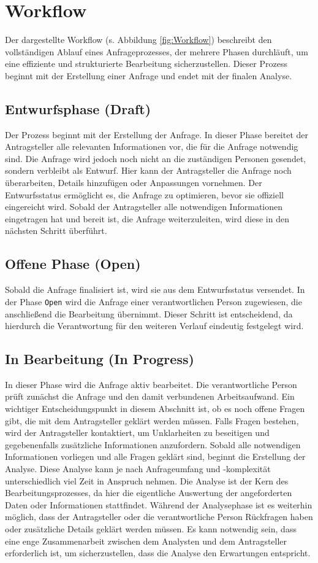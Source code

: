 \section{Workflow}
Der dargestellte Workflow (s. Abbildung \ref{fig:Workflow}) beschreibt den vollständigen Ablauf eines Anfrageprozesses, der mehrere Phasen durchläuft, um eine effiziente und strukturierte Bearbeitung sicherzustellen. Dieser Prozess beginnt mit der Erstellung einer Anfrage und endet mit der finalen Analyse.
\subsection*{Entwurfsphase (Draft)}
Der Prozess beginnt mit der Erstellung der Anfrage. In dieser Phase bereitet der Antragsteller alle relevanten Informationen vor, die für die Anfrage notwendig sind. Die Anfrage wird jedoch noch nicht an die zuständigen Personen gesendet, sondern verbleibt als Entwurf. Hier kann der Antragsteller die Anfrage noch überarbeiten, Details hinzufügen oder Anpassungen vornehmen. Der Entwurfsstatus ermöglicht es, die Anfrage zu optimieren, bevor sie offiziell eingereicht wird. Sobald der Antragsteller alle notwendigen Informationen eingetragen hat und bereit ist, die Anfrage weiterzuleiten, wird diese in den nächsten Schritt überführt.
\subsection*{Offene Phase (Open)}
Sobald die Anfrage finalisiert ist, wird sie aus dem Entwurfsstatus versendet. In der Phase \texttt{Open} wird die Anfrage einer verantwortlichen Person zugewiesen, die anschließend die Bearbeitung übernimmt. Dieser Schritt ist entscheidend, da hierdurch die Verantwortung für den weiteren Verlauf eindeutig festgelegt wird.
\subsection*{In Bearbeitung (In Progress)}
In dieser Phase wird die Anfrage aktiv bearbeitet. Die verantwortliche Person prüft zunächst die Anfrage und den damit verbundenen Arbeitsaufwand. Ein wichtiger Entscheidungspunkt in diesem Abschnitt ist, ob es noch offene Fragen gibt, die mit dem Antragsteller geklärt werden müssen. Falls Fragen bestehen, wird der Antragsteller kontaktiert, um Unklarheiten zu beseitigen und gegebenenfalls zusätzliche Informationen anzufordern.
\newline
Sobald alle notwendigen Informationen vorliegen und alle Fragen geklärt sind, beginnt die Erstellung der Analyse. Diese Analyse kann je nach Anfrageumfang und -komplexität unterschiedlich viel Zeit in Anspruch nehmen. Die Analyse ist der Kern des Bearbeitungsprozesses, da hier die eigentliche Auswertung der angeforderten Daten oder Informationen stattfindet.
\newline
Während der Analysephase ist es weiterhin möglich, dass der Antragsteller oder die verantwortliche Person Rückfragen haben oder zusätzliche Details geklärt werden müssen. Es kann notwendig sein, dass eine enge Zusammenarbeit zwischen dem Analysten und dem Antragsteller erforderlich ist, um sicherzustellen, dass die Analyse den Erwartungen entspricht.
